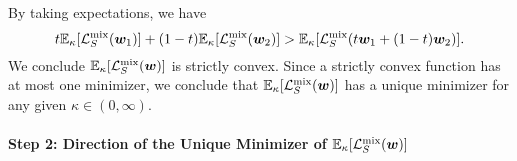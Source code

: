 By taking expectations, we have 
\begin{equation*}
    t \mathbb{E}_\kappa[\mathcal{L}_S^\mathrm{mix}({\bm{w}}_1)] + (1-t) \mathbb{E}_\kappa[\mathcal{L}_S^\mathrm{mix}({\bm{w}}_2)] >  \mathbb{E}_\kappa[\mathcal{L}_S^\mathrm{mix}(t{\bm{w}}_1+(1-t){\bm{w}}_2)].
\end{equation*}
We conclude $\mathbb{E}_\kappa[\mathcal{L}_S^\mathrm{mix}({\bm{w}})]$ is strictly convex.
Since a strictly convex function has at most one minimizer, we conclude that $\mathbb{E}_\kappa[\mathcal{L}_S^\mathrm{mix}({\bm{w}})]$ has a unique minimizer for any given $\kappa \in (0,\infty)$. 

\paragraph{Step 2: Direction of the Unique Minimizer of $\mathbb{E}_\kappa [\mathcal{L}_S^\mathrm{mix}({\bm{w}})]$} \mbox{}

